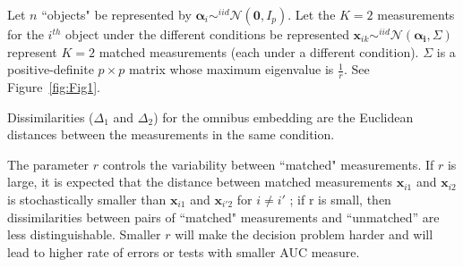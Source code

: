 \documentclass[12pt]{article} %
\begin{document}
  Let $n$ ``objects" be represented  by  $\bm{\alpha}_i \sim^{iid} \mathcal{N}(\bm{0},I_p)$.  Let the $K=2$ measurements for the $i^{th}$ object under the different conditions be represented  $\bm{x}_{ik}  \sim^{iid} \mathcal{N}(\bm{\alpha_i},\Sigma)$ represent $K=2$ matched measurements (each under a different condition).
  $\Sigma$ is a positive-definite $p\times p$ matrix whose maximum eigenvalue is   $\frac{1}{r} $. See Figure~\ref{fig:Fig1}.
  
 Dissimilarities ($\Delta_1$ and  $\Delta_2$) for the omnibus embedding are the Euclidean distances between the measurements in the same condition.
 
The parameter $r$ controls the variability between ``matched" measurements. If $r$ is large, it is expected that the distance between matched measurements
$\bm{x}_{i1}$ and $\bm{x}_{i2}$ is stochastically smaller than $\bm{x}_{i1}$ and $\bm{x}_{i'2}$ for $i \neq i'$ ; if r is small, then dissimilarities  between pairs of ``matched"  measurements and 
``unmatched'' are less distinguishable. Smaller $r$ will make the decision problem harder and will lead to higher rate of errors or tests with smaller AUC measure.
\end{document}
